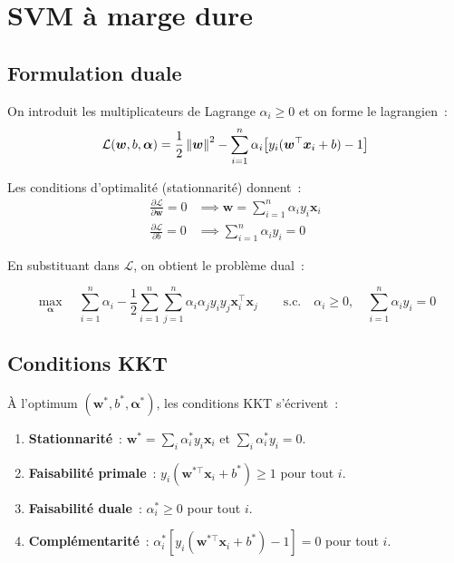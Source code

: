 \section{SVM \`a marge dure}
\label{sec:hard-margin}

\subsection{Formulation duale}

On introduit les multiplicateurs de Lagrange $\alpha_i \geq 0$ et on forme le
lagrangien~:
\begin{equation}
  \mathcal{L}(\bm{w}, b, \bm{\alpha}) = \frac{1}{2}\left\| \bm{w} \right\|^2
  - \sum_{i=1}^n \alpha_i \bigl[ y_i(\bm{w}^\top\bm{x}_i + b) - 1 \bigr]
\end{equation}

Les conditions d'optimalit\'e (stationnarit\'e) donnent~:
\begin{align}
  \frac{\partial \mathcal{L}}{\partial \bm{w}} = 0
  &\implies \bm{w} = \sum_{i=1}^n \alpha_i y_i \bm{x}_i
  \label{eq:svm-w-dual} \\
  \frac{\partial \mathcal{L}}{\partial b} = 0
  &\implies \sum_{i=1}^n \alpha_i y_i = 0
  \label{eq:svm-b-dual}
\end{align}

En substituant dans $\mathcal{L}$, on obtient le probl\`eme dual~:

\begin{formules}[title=\textbf{Probl\`eme dual (marge dure)}]
\begin{equation}
\boxed{
  \max_{\bm{\alpha}} \quad \sum_{i=1}^n \alpha_i
  - \frac{1}{2}\sum_{i=1}^n\sum_{j=1}^n \alpha_i \alpha_j y_i y_j
    \bm{x}_i^\top \bm{x}_j
  \qquad \text{s.c.} \quad \alpha_i \geq 0, \quad
  \sum_{i=1}^n \alpha_i y_i = 0
}
\label{eq:dual-hard}
\end{equation}
\end{formules}

\subsection{Conditions KKT}

\begin{theoreme}
\`A l'optimum $(\bm{w}^*, b^*, \bm{\alpha}^*)$, les conditions KKT
s'\'ecrivent~:
\begin{enumerate}
  \item \textbf{Stationnarit\'e}~: $\bm{w}^* = \sum_i \alpha_i^* y_i \bm{x}_i$
    et $\sum_i \alpha_i^* y_i = 0$.
  \item \textbf{Faisabilit\'e primale}~:
    $y_i(\bm{w}^{*\top}\bm{x}_i + b^*) \geq 1$ pour tout $i$.
  \item \textbf{Faisabilit\'e duale}~: $\alpha_i^* \geq 0$ pour tout $i$.
  \item \textbf{Compl\'ementarit\'e}~:
    $\alpha_i^*[y_i(\bm{w}^{*\top}\bm{x}_i + b^*) - 1] = 0$ pour tout $i$.
\end{enumerate}
\end{theoreme}

